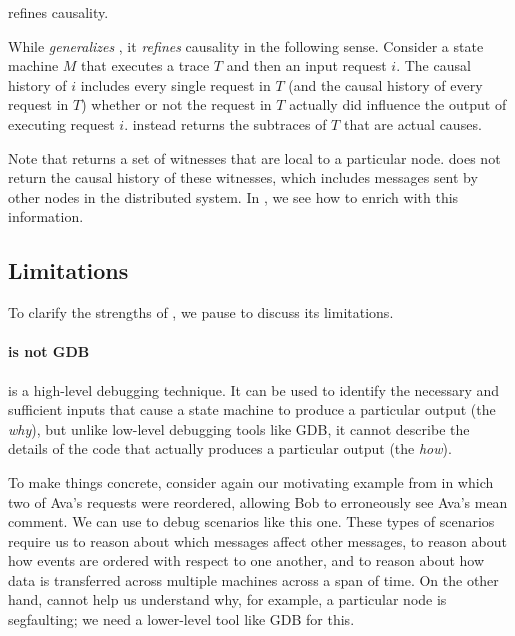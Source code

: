 \begin{claim}
  \Watprovenance{} refines causality.
\end{claim}

While \watprovenance{} \emph{generalizes} \whyprovenance{}, it \emph{refines}
causality in the following sense. Consider a state machine $M$ that executes a
trace $T$ and then an input request $i$. The causal history of $i$ includes
every single request in $T$ (and the causal history of every request in $T$)
whether or not the request in $T$ actually did influence the output of
executing request $i$. \Watprovenance{} instead returns the subtraces of $T$
that are actual causes.

Note that \watprovenance{} returns a set of witnesses that are local to a
particular node. \Watprovenance{} does not return the causal history of these
witnesses, which includes messages sent by other nodes in the distributed
system. In , we see how to enrich \watprovenance{} with this
information.

\subsection{Limitations}
To clarify the strengths of \watprovenance{}, we pause to discuss its
limitations.

\paragraph{\Watprovenance{} is not GDB}
\Watprovenance{} is a high-level debugging technique. It can be used to
identify the necessary and sufficient inputs that cause a state machine to
produce a particular output (the \emph{why}), but unlike low-level debugging
tools like GDB, it cannot describe the details of the code that actually
produces a particular output (the \emph{how}).

To make things concrete, consider again our motivating example from
 in which two of Ava's requests were reordered,
allowing Bob to erroneously see Ava's mean comment. We can use \watprovenance{}
to debug scenarios like this one. These types of scenarios require us to reason
about which messages affect other messages, to reason about how events are
ordered with respect to one another, and to reason about how data is transferred
across multiple machines across a span of time. On the other hand,
\watprovenance{} cannot help us understand why, for example, a particular node
is segfaulting; we need a lower-level tool like GDB for this.


